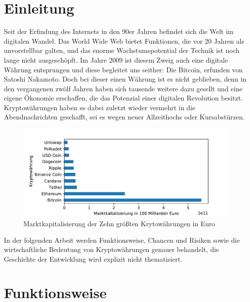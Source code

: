 \documentclass[12pt,oneside]{article}
\begin{document}
\cleardoublepage
{}  
    \setcounter{page}{1}
\lhead{\nouppercase{\leftmark}}


\section{Einleitung} \label{einleitung}

Seit der Erfindung des Internets in den 90er Jahren befindet sich die Welt im digitalen Wandel. Das World Wide Web bietet Funktionen, die vor 20 Jahren als unvorstellbar galten, und das enorme Wachstumspotential der Technik ist noch lange nicht ausgeschöpft. Im Jahre 2009 ist diesem Zweig auch eine digitale Währung entsprungen und diese begleitet uns seither: Die Bitcoin, erfunden von Satoshi Nakamoto. 
Doch bei dieser einen Währung ist es nicht geblieben, denn in den vergangenen zwölf Jahren haben sich tausende weitere dazu gesellt und eine eigene Ökonomie erschaffen, die das Potenzial einer digitalen Revolution besitzt.
Kryptowährungen haben es dabei zuletzt wieder vermehrt in die Abendnachrichten geschafft, sei es wegen neuer Allzeithochs oder Kursabstürzen.\cite[p. 95-97]{schredder2018}

\begin{figure}[h]
\includegraphics[scale=0.9]{./images/marketcap.pdf}
\caption{Marktkapitalisierung der Zehn größten Krytowährungen in Euro \cite{coinmarketcap}}
\centering
\end{figure}


In der folgenden Arbeit werden Funktionsweise, Chancen und Risiken sowie die wirtschaftliche Bedeutung von Kryptowährungen genauer behandelt, die Geschichte der Entwicklung wird explizit nicht thematisiert.

\section{Funktionsweise}
\end{document}
